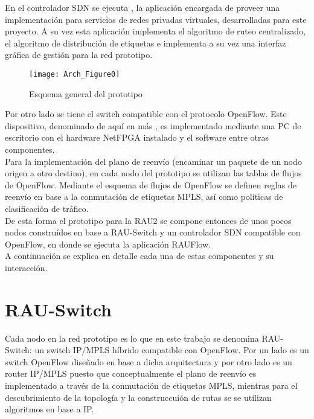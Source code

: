 En el controlador SDN se ejecuta , la aplicaci\'on encargada de proveer una implementaci\'on para servicios de redes privadas virtuales, desarrolladas para este proyecto. A su vez esta aplicaci\'on implementa el algoritmo de ruteo  centralizado, el algoritmo de distribución de etiquetas e implementa a su vez una interfaz gr\'afica de gesti\'on para la red prototipo.\\

\begin{figure}[h] 
\centering    
\texttt{[image: Arch\_Figure0]}
\caption[Esquema general del prototipo]{Esquema general del prototipo}
\label{fig:OpenSourceRArch0}
\end{figure}

Por otro lado se tiene el switch compatible con el protocolo OpenFlow. Este dispositivo, denominado de aqu\'i en m\'as , es implementado mediante una PC de escritorio con el hardware NetFPGA instalado y el software  entre otras componentes.\\ 

Para la implementaci\'on del plano de reenvío (encaminar un paquete de un nodo origen a otro destino), en cada nodo del prototipo se utilizan las tablas de flujos de OpenFlow. Mediante el esquema de flujos de OpenFlow se definen reglas de reenv\'io en base a la conmutaci\'on de etiquetas MPLS, as\'i como pol\'iticas de clasificaci\'on de tr\'afico.\\

De esta forma el prototipo para la RAU2 se compone entonces de unos pocos nodos constru\'idos en base a RAU-Switch y un controlador SDN compatible con OpenFlow, en donde se ejecuta la aplicaci\'on RAUFlow.\\

A continuaci\'on se explica en detalle cada una de estas componentes y su interacci\'on.

\section{RAU-Switch}
Cada nodo en la red prototipo es lo que en este trabajo se denomina RAU-Switch: un switch IP/MPLS h\'ibrido compatible con OpenFlow. Por un lado es un switch OpenFlow dise\~nado en base a dicha arquitectura y por otro lado es un router IP/MPLS puesto que conceptualmente el plano de reenvío es implementado a trav\'es de la conmutación de etiquetas MPLS, mientras para el descubrimiento de la topolog\'ia y la construccui\'on de rutas se se utilizan algoritmos en base a IP.\\


